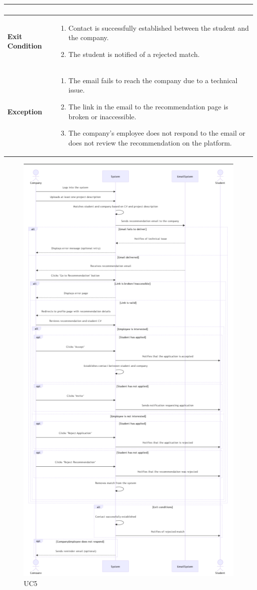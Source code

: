 \begin{longtable}{|p{}|p{}|}
\begin{enumerate}
\end{enumerate}\\
\hline
\textbf{Exit Condition} &  
\begin{enumerate}
    \item  Contact is successfully established between the student and the company.
    \item  The student is notified of a rejected match.
\end{enumerate} \\
\hline
\textbf{Exception} &  
\begin{enumerate}
    \item  The email fails to reach the company due to a technical issue.
    \item  The link in the email to the recommendation page is broken or inaccessible.
    \item  The company’s employee does not respond to the email or does not review the recommendation on the platform.	
\end{enumerate}
\\
\hline
\end{longtable}

\begin{figure}[H]
    \centering
    \includegraphics[width=0.65\linewidth]{RASD//Images/UC5.png}
    \caption{UC5}
\end{figure}

